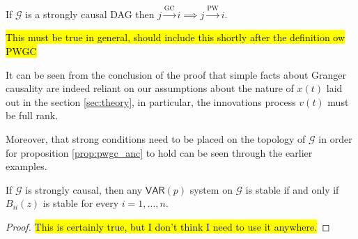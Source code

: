 \documentclass[12pt]{article}
\def\gc{\overset{\text{GC}}{\rightarrow}}  %
\def\pwgc{\overset{\text{PW}}{\rightarrow}}  %
\def\gcg{\mathcal{G}}  %
\def\VAR{\mathsf{VAR}}  %
\newcommand{\pa}[1]{pa(#1)}  %
\begin{document}
\begin{corollary}
  \label{cor:gc_implies_pwgc}
  If $\gcg$ is a strongly causal DAG then $j \gc i \implies j \pwgc i$.

  \hl{This must be true in general, should include this shortly after the definition ow PWGC}
\end{corollary}

\begin{remark}
  It can be seen from the conclusion of the proof that simple facts
  about Granger causality are indeed reliant on our assumptions about
  the nature of $x(t)$ laid out in the section \ref{sec:theory}, in
  particular, the innovations process $v(t)$ must be full rank.
  
  Moreover, that strong conditions need to be placed on the topology
  of $\gcg$ in order for proposition \ref{prop:pwgc_anc} to hold can
  be seen through the earlier examples.
\end{remark}

\begin{lemma}
  If $\gcg$ is strongly causal, then any $\VAR(p)$ system on $\gcg$ is stable if and only if
  $B_{ii}(z)$ is stable for every $i = 1, \ldots, n$.
\end{lemma}
\begin{proof}
  \hl{This is certainly true, but I don't think I need to use it anywhere.}
\end{proof}





\end{document}
